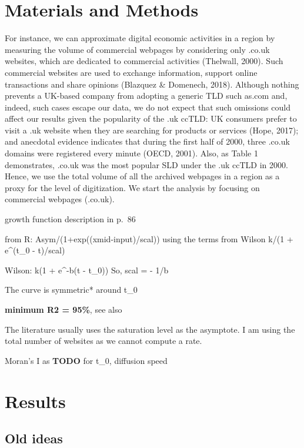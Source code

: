 \documentclass[
  authoryear,
  preprint,
  3p]{elsarticle}
\begin{document}
\hypertarget{sec3}{%
\section{Materials and Methods}\label{sec3}}

For instance, we can approximate digital economic activities in a region
by measuring the volume of commercial webpages by considering only
.co.uk websites, which are dedicated to commercial activities (Thelwall,
2000). Such commercial websites are used to exchange information,
support online transactions and share opinions (Blazquez \& Domenech,
2018). Although nothing prevents a UK-based company from adopting a
generic TLD such as.com and, indeed, such cases escape our data, we do
not expect that such omissions could affect our results given the
popularity of the .uk ccTLD: UK consumers prefer to visit a .uk website
when they are searching for products or services (Hope, 2017); and
anecdotal evidence indicates that during the first half of 2000, three
.co.uk domains were registered every minute (OECD, 2001). Also, as Table
1 demonstrates, .co.uk was the most popular SLD under the .uk ccTLD in
2000. Hence, we use the total volume of all the archived webpages in a
region as a proxy for the level of digitization. We start the analysis
by focusing on commercial webpages (.co.uk).

\citet{wilson201281} growth function description in p.~86

from R: Asym/(1+exp((xmid-input)/scal)) using the terms from Wilson k/(1
+ e\^{}(t\_0 - t)/scal)

Wilson: k(1 + e\^{}-b(t - t\_0)) So, scal = - 1/b

The curve is symmetric* around t\_0

\textbf{minimum R2 = 95\%}, see also \citet{grubler1990rise}

The literature usually uses the saturation level as the asymptote. I am
using the total number of websites as we cannot compute a rate.

Moran's I as \citet{ding2010modeling} \textbf{TODO} for t\_0, diffusion
speed

\hypertarget{results}{%
\section{Results}\label{results}}

\hypertarget{old-ideas}{%
\subsection{Old ideas}\label{old-ideas}}
\end{document}
